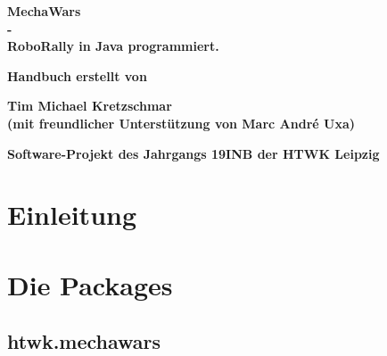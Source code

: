 \documentclass[12pt,a4paper,oneside]{book}
\theoremstyle{plain}
\numberwithin{equation}{chapter} \DeclareMathOperator{\Var}{Var}
\begin{document}
\thispagestyle{empty}

\begin{center}
\large{\textbf{MechaWars\\-\\RoboRally in Java programmiert.}}
\end{center}

\vskip2.5cm

\begin{center}
\textbf{Handbuch erstellt von}
\end{center}

\vskip0.6cm

\begin{center}
\textbf{Tim Michael Kretzschmar}\\
\textbf{(mit freundlicher Unterstützung von Marc André Uxa)}

\end{center}


\vskip0.5cm
 
\begin{center}
\textbf{Software-Projekt des Jahrgangs 19INB der HTWK Leipzig}
\end{center}


\section*{}
\newpage

\tableofcontents
%


\newpage
{}
\chapter{Einleitung}

   
    \newpage


\chapter{Die Packages}
\section{htwk.mechawars}
\hypertarget{ConfigReader.java}{}
\end{document}

